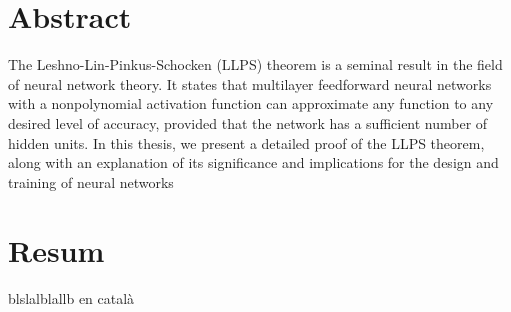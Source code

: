 \documentclass[../../main.tex]{subfiles}
\begin{document}
\chapter*{Abstract}\label{ch:abstract} 

The Leshno-Lin-Pinkus-Schocken (LLPS) theorem is a seminal result in the field of neural network theory. It states that multilayer feedforward neural networks with a nonpolynomial activation function can approximate any function to any desired level of accuracy, provided that the network has a sufficient number of hidden units. In this thesis, we present a detailed proof of the LLPS theorem, along with an explanation of its significance and implications for the design and training of neural networks


\chapter*{Resum}

blslalblallb en català
\end{document}
